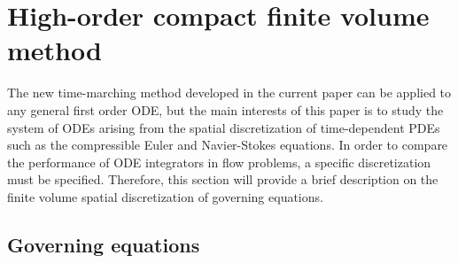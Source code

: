 \section{High-order compact finite volume method}
\label{sec:CFV}

The new time-marching method developed in
the current paper can be applied to any general first order
ODE, but the main interests of this paper is to study 
the system of ODEs arising from the spatial discretization of
time-dependent PDEs such as the compressible Euler and Navier-Stokes
equations.
In order to compare the performance of ODE integrators in flow problems,
a specific discretization must be specified.
Therefore,
this section will provide a brief description on the
finite volume spatial discretization of governing equations.

\subsection{Governing equations}
\label{ssec:GovEq}


